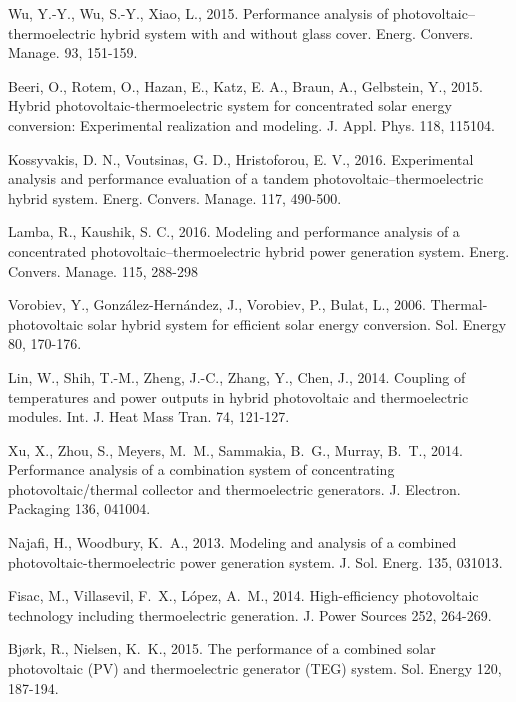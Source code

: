 \documentclass[fleqn,10pt]{SelfArx} %
\begin{document}
\begin{thebibliography}{}
Wu, Y.-Y., Wu, S.-Y., Xiao, L., 2015. Performance analysis of photovoltaic--thermoelectric hybrid system with and without glass cover. Energ. Convers. Manage. 93, 151-159.

Beeri, O., Rotem, O., Hazan, E., Katz, E. A., Braun, A., Gelbstein, Y., 2015. Hybrid photovoltaic-thermoelectric system for concentrated solar energy conversion: Experimental realization and modeling. J. Appl. Phys. 118, 115104.

Kossyvakis, D. N., Voutsinas, G. D., Hristoforou, E. V., 2016. Experimental analysis and performance evaluation of a tandem photovoltaic–thermoelectric hybrid system. Energ. Convers. Manage. 117, 490-500.

Lamba, R., Kaushik, S. C., 2016. Modeling and performance analysis of a concentrated photovoltaic–thermoelectric hybrid power generation system. Energ. Convers. Manage. 115, 288-298

Vorobiev, Y., Gonz{\'a}lez-Hern{\'a}ndez, J., Vorobiev, P., Bulat, L., 2006. Thermal-photovoltaic solar hybrid system for efficient solar energy conversion. Sol. Energy 80, 170-176.

Lin, W., Shih, T.-M., Zheng, J.-C., Zhang, Y., Chen, J., 2014. Coupling of temperatures and power outputs in hybrid photovoltaic and thermoelectric modules. Int. J. Heat Mass Tran. 74, 121-127.

Xu, X., Zhou, S., Meyers, M.~M., Sammakia, B.~G., Murray, B.~T., 2014. Performance analysis of a combination system of concentrating photovoltaic/thermal collector and thermoelectric generators. J. Electron. Packaging 136, 041004.

Najafi, H., Woodbury, K.~A., 2013. Modeling and analysis of a combined photovoltaic-thermoelectric power generation system. J. Sol. Energ. 135, 031013.

Fisac, M., Villasevil, F.~X., L{\'o}pez, A.~M., 2014. High-efficiency photovoltaic technology including thermoelectric generation. J. Power Sources 252, 264-269.

Bj{\o}rk, R., Nielsen, K.~K., 2015. The performance of a combined solar photovoltaic (PV) and thermoelectric generator (TEG) system. Sol. Energy 120, 187-194.


\end{thebibliography}
\end{document}
